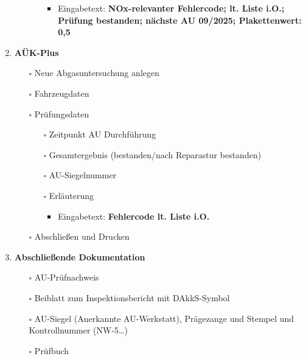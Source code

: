 \documentclass{vorlage-design-main}
\begin{document}
\begin{enumerate}
\begin{itemize}
\begin{itemize}
      \begin{itemize}
      
      \item
        Eingabetext: \textbf{NOx-relevanter Fehlercode; lt. Liste i.O.;
        Prüfung bestanden; nächste AU 09/2025; Plakettenwert: 0,5}
      \end{itemize}
    \end{itemize}
  \end{itemize}
\item
  \textbf{AÜK-Plus}

  \begin{itemize}
  
  \item[$\square$]
    Neue Abgasuntersuchung anlegen
  \item[$\square$]
    Fahrzeugdaten
  \item[$\square$]
    Prüfungsdaten

    \begin{itemize}
    
    \item[$\square$]
      Zeitpunkt AU Durchführung
    \item[$\square$]
      Gesamtergebnis (bestanden/nach Reparastur bestanden)
    \item[$\square$]
      AU-Siegelnummer
    \item[$\square$]
      Erläuterung

      \begin{itemize}
      
      \item
        Eingabetext: \textbf{Fehlercode lt. Liste i.O.}
      \end{itemize}
    \end{itemize}
  \item[$\square$]
    Abschließen und Drucken
  \end{itemize}
\item
  \textbf{Abschließende Dokumentation}

  \begin{itemize}
  
  \item[$\square$]
    AU-Prüfnachweis
  \item[$\square$]
    Beiblatt zum Inspektionsbericht mit DAkkS-Symbol
  \item[$\square$]
    AU-Siegel (Anerkannte AU-Werkstatt), Prägezange und Stempel und
    Kontrollnummer (NW-5\ldots)
  \item[$\square$]
    Prüfbuch
  \end{itemize}
\end{enumerate}
\end{document}
